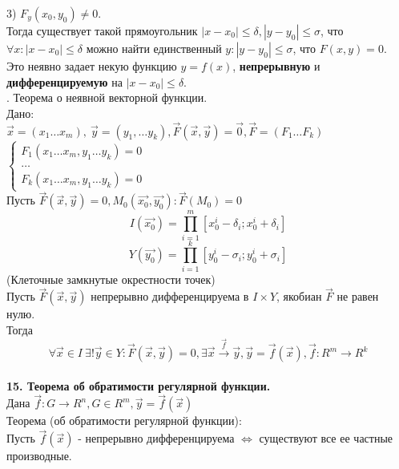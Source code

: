 \documentclass[12pt]{article}
\begin{document}
3) $F_y(x_0,y_0) \neq 0$.\\
Тогда существует такой прямоугольник $|x-x_0|\leq\delta, |y-y_0|\leq\sigma$, что $\forall x : |x-x_0|\leq\delta$ можно найти единственный $y : |y-y_0|\leq\sigma$, что $F(x,y)=0$.\\
Это неявно задает некую функцию $y=f(x)$, \textbf{непрерывную} и \textbf{дифференцируемую} на $|x-x_0|\leq\delta$.\\
. Теорема о неявной векторной функции.\\
Дано:\\
$\overrightarrow{x}=(x_1\dots x_m), \ \overrightarrow{y}=(y_1,\dots y_k), \overrightarrow{F}(\overrightarrow{x},\overrightarrow{y})=\overrightarrow{0}, \overrightarrow{F} = (F_1 \dots F_k)$\\
$\begin{cases}F_1(x_1\dots x_m, y_1 \dots y_k)=0 \\ \dots \\ F_k(x_1\dots x_m, y_1 \dots y_k)=0 \end{cases}$\\
Пусть $\overrightarrow{F}(\overrightarrow{x},\overrightarrow{y})=0, M_0(\overrightarrow{x_0},\overrightarrow{y_0}) : \overrightarrow{F}(M_0) = 0$\\
$$I(\overrightarrow{x_0}) = \prod_{i=1}^m [x_0^i-\delta_i; x_0^i+\delta_i]$$
$$Y(\overrightarrow{y_0}) = \prod_{i=1}^k [y_0^i-\sigma_i; y_0^i+\sigma_i]$$
(Клеточные замкнутые окрестности точек)\\
Пусть $\overrightarrow{F}(\overrightarrow{x},\overrightarrow{y})$ непрерывно дифференцируема в $I \times Y$, якобиан $\overrightarrow{F}$ не равен нулю.\\
Тогда\\
$$\forall \overrightarrow{x} \in I \ \exists! \overrightarrow{y} \in Y : \overrightarrow{F}(\overrightarrow{x},\overrightarrow{y})=0, \exists\overrightarrow{x} \overset{\overrightarrow{f}}{\to}\overrightarrow{y}, \overrightarrow{y}=\overrightarrow{f}(\overrightarrow{x}), \overrightarrow{f}:R^m\to R^k$$
\\
\label{question15}\textbf{15. Теорема об обратимости регулярной функции.}\\
Дана $\overrightarrow{f} : G \to R^n, G\in R^m, \overrightarrow{y} = \overrightarrow{f}(\overrightarrow{x})$\\
Теорема (об обратимости регулярной функции):\\
Пусть $\overrightarrow{f}(\overrightarrow{x})$ - непрерывно дифференцируема $\iff$ существуют все ее частные производные.\\
\end{document}
